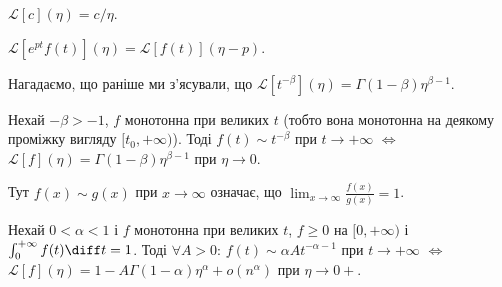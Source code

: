 \begin{lemma}
    $\mathscr{L}[c](\eta) = c / \eta$.
\end{lemma}

\begin{lemma}
    $\mathscr{L}[e^{p t} f(t)](\eta) = \mathscr{L}[f(t)](\eta - p)$.
\end{lemma}

Нагадаємо, що раніше ми з'ясували, що
$\mathscr{L}[t^{-\beta}](\eta) = \Gamma(1 - \beta) \eta^{\beta - 1}$.

\begin{theorem}[Таубера]
    Нехай $- \beta > - 1$, $f$ монотонна при великих $t$ (тобто вона монотонна на деякому проміжку вигляду $[t_0,+\infty)$). Тоді $f(t) \sim t^{-\beta}$ при $t \to +\infty$ $\iff$ $\mathscr{L}[f](\eta) = \Gamma(1 - \beta) \eta^{\beta - 1}$ при $\eta \to 0$.
\end{theorem}

\begin{remark}
    Тут $f(x) \sim g(x)$ при $x \to \infty$ означає, що $\lim_{x \to \infty} \frac{f(x)}{g(x)} = 1$.
\end{remark}

\begin{corollary}
    Нехай $0 < \alpha < 1$ і $f$ монотонна при великих $t$, $f \ge 0$ на $[0, +\infty)$ і $\int_0^{+\infty} f(t) \diff t = 1$. Тоді $\forall A > 0$: $f(t) \sim \alpha A t^{-\alpha - 1}$ при $t \to +\infty$ $\iff$ $\mathscr{L}[f](\eta) = 1 - A \Gamma(1 - \alpha) \eta^\alpha + o(n^\alpha)$ при $\eta \to 0+$.
\end{corollary}

